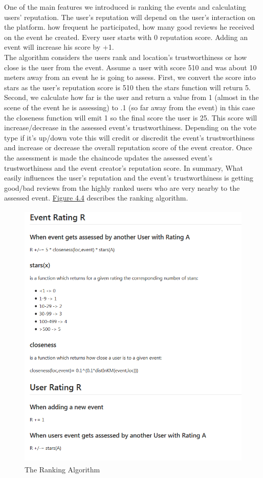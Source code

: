 One of the main features we introduced is ranking the events and calculating users' reputation.
The user's reputation will depend on the user's interaction on the platform. how frequent he participated, how many good reviews he received on the event he created. 
Every user starts with 0 reputation score. Adding an event will increase his score by +1.  \\
The algorithm considers the users rank and location's trustworthiness or how close is the user from the event.
Assume a user with score 510 and was about 10 meters away from an event he is going to assess. First, we convert the score into stars as the user's reputation score is 510 then the stars function will return 5. Second, we calculate how far is the user and return a value from 1 (almost in the scene of the event he is assessing)  to .1 (so far away from the event) in this case the closeness function will emit 1 so the final score the user is 25. This score will increase/decrease in the assessed event's trustworthiness. Depending on the vote type if it's up/down vote this will credit or discredit the event's trustworthiness and increase or decrease the overall reputation score of the event creator. 
Once the assessment is made the chaincode updates the assessed event's trustworthiness and the event creator's reputation score.
In summary, What easily influences the user’s reputation and the event's trustworthiness is getting good/bad reviews from the highly ranked users who are very nearby to the assessed event. 
\hyperref[fig:mainactivityflow]{Figure 4.4} describes the ranking algorithm. 
 \begin{figure}[H]
\center
\includegraphics[width=14cm,height=13cm]{images/ranking.png}
\caption{The Ranking Algorithm}
\label{fig:ranking}
\end{figure}
 
